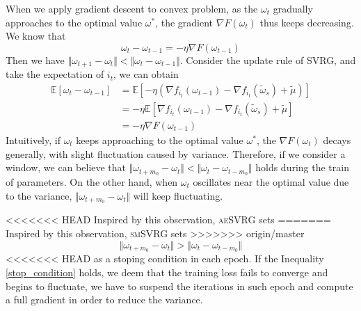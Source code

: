 \documentclass[conference]{IEEEtran}
\begin{document}
 When we apply gradient descent to convex problem, as the $\omega_t$ gradually approaches to the optimal value $\omega^*$, the gradient $\nabla F(\omega_t)$ thus keeps decreasing. We know that
 $$\omega_t - \omega_{t-1} = -\eta\nabla F(\omega_{t-1})$$
 Then we have $\Vert\omega_{t+1}-\omega_t\Vert<\Vert\omega_{t}-\omega_{t-1}\Vert$. 
Consider the update rule of SVRG, and take the expectation of $i_t$, we can obtain
 \begin{equation}
\label{sgdinequality}
\begin{split}
\mathbb{E}[\omega_t -\omega_{t-1}] &=  \mathbb{E}[- \eta(\nabla f_{i_t}(\omega_{t-1}) - \nabla f_{i_t}(\tilde{\omega}_s)+\tilde{\mu})]\\
&=-\eta\mathbb{E}[\nabla f_{i_t}(\omega_{t-1}) - \nabla f_{i_t}(\tilde{\omega}_s)+\tilde{\mu}]\\
&=-\eta\nabla F(\omega_{t-1})
\end{split}
\end{equation}
 Intuitively, if $\omega_t$ keeps approaching to the optimal value $\omega^*$, the $\nabla F(\omega_{t})$ decays generally, with slight fluctuation caused by variance. Therefore, if we consider a window, we can believe that $\Vert\omega_{t+m_0}-\omega_t\Vert<\Vert\omega_{t}-\omega_{t-m_0}\Vert$ holds  during the train of parameters.  
 On the other hand, when $\omega_t$ oscillates near the optimal value due to the variance, $\Vert\omega_{t+m_0}-\omega_t\Vert$ will keep fluctuating. 

<<<<<<< HEAD
 Inspired by this observation, \textsc{aeSVRG}  sets 
=======
 Inspired by this observation, \textsc{smSVRG}  sets 
>>>>>>> origin/master
 \begin{equation}
 \label{stop_condition}
 \Vert\omega_{t+m_0}-\omega_t\Vert>\Vert\omega_{t}-\omega_{t-m_0}\Vert
 \end{equation}
<<<<<<< HEAD
 as a stoping condition in each epoch. If the Inequality \ref{stop_condition} holds, we deem that the training loss fails to converge and begins to fluctuate, we have to suspend the iterations in such epoch and compute a full gradient in order to reduce the variance.
 
\end{document}
